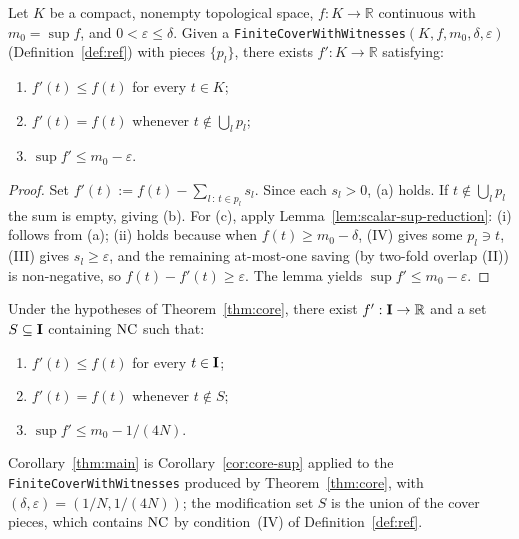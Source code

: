 \begin{corollary}
\label{cor:core-sup}
Let $K$ be a compact, nonempty topological space,
$f : K \to \mathbb{R}$ continuous with $m_0 = \sup f$, and
$0 < \varepsilon \le \delta$. Given a
\texttt{FiniteCoverWithWitnesses}$(K, f, m_0, \delta, \varepsilon)$
(Definition~\ref{def:ref}) with pieces $\{p_l\}$, there exists
$f' : K \to \mathbb{R}$ satisfying:
\begin{enumerate}
\item[\textup{(a)}] $f'(t) \le f(t)$ for every $t \in K$;
\item[\textup{(b)}] $f'(t) = f(t)$ whenever $t \notin \bigcup_l p_l$;
\item[\textup{(c)}] $\sup f' \le m_0 - \varepsilon$.
\end{enumerate}
\end{corollary}

\begin{proof}
Set $f'(t) := f(t) - \sum_{l \,:\, t \in p_l} s_l$. Since each
$s_l > 0$, (a) holds. If $t \notin \bigcup_l p_l$ the sum is
empty, giving (b). For (c), apply
Lemma~\ref{lem:scalar-sup-reduction}: (i) follows from (a);
(ii) holds because when $f(t) \ge m_0 - \delta$, (IV) gives
some $p_l \ni t$, (III) gives $s_l \ge \varepsilon$, and the
remaining at-most-one saving (by two-fold overlap (II)) is
non-negative, so $f(t) - f'(t) \ge \varepsilon$. The lemma
yields $\sup f' \le m_0 - \varepsilon$.
\end{proof}

\begin{corollary}
\label{thm:main}
Under the hypotheses of Theorem~\ref{thm:core}, there exist
$f' : \mathbf{I} \to \mathbb{R}$ and a set $S \subseteq \mathbf{I}$
containing $\mathrm{NC}$ such that:
\begin{enumerate}
\item[\textup{(a)}] $f'(t) \le f(t)$ for every $t \in \mathbf{I}$;
\item[\textup{(b)}] $f'(t) = f(t)$ whenever $t \notin S$;
\item[\textup{(c)}] $\sup f' \le m_0 - 1/(4N)$.
\end{enumerate}
\end{corollary}

Corollary~\ref{thm:main} is Corollary~\ref{cor:core-sup} applied
to the \texttt{FiniteCoverWithWitnesses} produced by
Theorem~\ref{thm:core}, with
$(\delta, \varepsilon) = (1/N, 1/(4N))$; the modification set
$S$ is the union of the cover pieces, which contains $\mathrm{NC}$ by
condition~(IV) of Definition~\ref{def:ref}.

